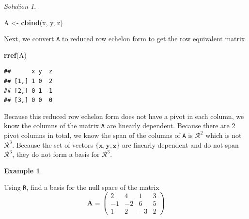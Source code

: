 \documentclass[
]{book}
\newenvironment{Shaded}{\begin{snugshade}}{\end{snugshade}}
\newcommand{\KeywordTok}[1]{\textcolor[rgb]{0.13,0.29,0.53}{\textbf{#1}}}
\newcommand{\NormalTok}[1]{#1}
\newcommand{\StringTok}[1]{\textcolor[rgb]{0.31,0.60,0.02}{#1}}
\theoremstyle{definition}
\theoremstyle{definition}
\newtheorem{example}{Example}[chapter]
\theoremstyle{definition}
\theoremstyle{remark}
\newtheorem*{solution}{Solution}
\begin{document}
\begin{solution}
\begin{Shaded}
\begin{Highlighting}[]
\NormalTok{A <-}\StringTok{ }\KeywordTok{cbind}\NormalTok{(x, y, z)}
\end{Highlighting}
\end{Shaded}

Next, we convert \texttt{A} to reduced row echelon form to get the row equivalent matrix

\begin{Shaded}
\begin{Highlighting}[]
\KeywordTok{rref}\NormalTok{(A)}
\end{Highlighting}
\end{Shaded}

\begin{verbatim}
##      x y  z
## [1,] 1 0  2
## [2,] 0 1 -1
## [3,] 0 0  0
\end{verbatim}

Because this reduced row echelon form does not have a pivot in each column, we know the columns of the matrix \texttt{A} are linearly dependent. Because there are 2 pivot columns in total, we know the span of the columns of \texttt{A} is \(\mathcal{R}^2\) which is not \(\mathcal{R}^3\). Because the set of vectors \(\{ \mathbf{x}, \mathbf{y}, \mathbf{z} \}\) are linearly dependent and do not span \(\mathcal{R}^3\), they do not form a basis for \(\mathcal{R}^3\).

\end{solution}

\begin{example}
\protect\hypertarget{exm:unlabeled-div-91}{}\label{exm:unlabeled-div-91}

Using \texttt{R}, find a basis for the null space of the matrix
\[
\mathbf{A} = \begin{pmatrix} 2 & 4 & 1 & 3 \\ -1 & -2 & 6 & 5 \\ 1 & 2 & -3 & 2 \end{pmatrix}
\]

\end{example}
\end{document}

